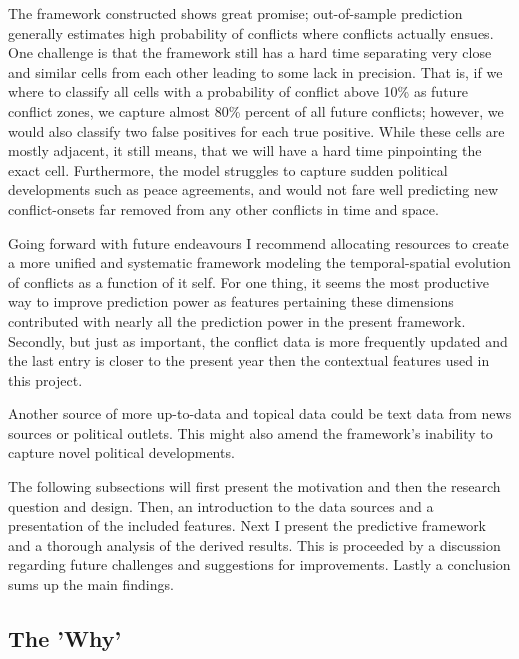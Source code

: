 \documentclass[a4paper]{article}
\begin{document}
The framework constructed shows great promise; out-of-sample prediction generally estimates high probability of conflicts where conflicts actually ensues. One challenge is that the framework still has a hard time separating very close and similar cells from each other leading to some lack in precision. That is, if we where to classify all cells with a probability of conflict above 10\% as future conflict zones, we capture almost 80\% percent of all future conflicts; however, we would also classify two false positives for each true positive. While these cells are mostly adjacent, it still means, that we will have a hard time pinpointing the exact cell. Furthermore, the model struggles to capture sudden political developments such as peace agreements, and would not fare well predicting new conflict-onsets far removed from any other conflicts in time and space.\par

Going forward with future endeavours I recommend allocating resources to create a more unified and systematic framework modeling the temporal-spatial evolution of conflicts as a function of it self. For one thing, it seems the most productive way to improve prediction power as features pertaining these dimensions contributed with nearly all the prediction power in the present framework. Secondly, but just as important, the conflict data is more frequently updated and the last entry is closer to the present year then the contextual features used in this project.\par

Another source of more up-to-data and topical data could be text data from news sources or political outlets. This might also amend the framework's inability to capture novel political developments.\par

The following subsections will first present the motivation and then the research question and design. Then, an introduction to the data sources and a presentation of the included features. Next I present the predictive framework and a thorough analysis of the derived results. This is proceeded by a discussion regarding future challenges and suggestions for improvements. Lastly a conclusion sums up the main findings.\par

\subsection{The 'Why'}
\end{document}
